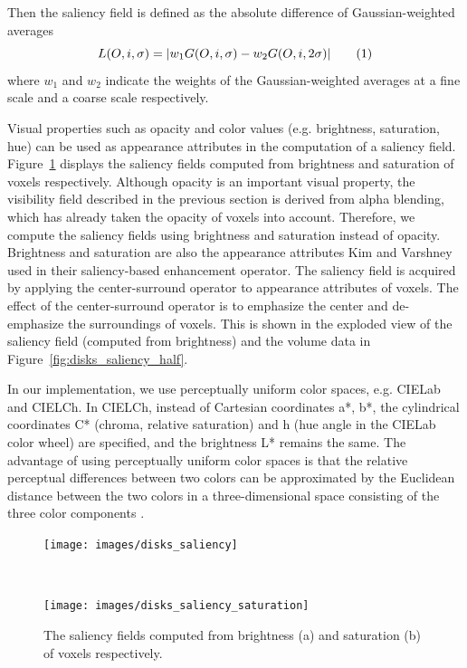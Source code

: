 Then the saliency field is defined as the absolute difference of Gaussian-weighted averages
\[ L(O,i,\sigma)=|w_{1}G(O,i,\sigma)-w_{2}G(O,i,2\sigma)|
\addtag \]
where $ w_{1} $ and $ w_{2} $ indicate the weights of the Gaussian-weighted averages at a fine scale and a coarse scale respectively.

Visual properties such as opacity and color values (e.g. brightness, saturation, hue) can be used as appearance attributes in the computation of a saliency field.
Figure~\ref{fig:disks_saliency} displays the saliency fields computed from brightness and saturation of voxels respectively.
Although opacity is an important visual property, the visibility field described in the previous section is derived from alpha blending, which has already taken the opacity of voxels into account. Therefore, we compute the saliency fields using brightness and saturation instead of opacity. Brightness and saturation are also the appearance attributes Kim and Varshney \cite{kim_saliency-guided_2006} used in their saliency-based enhancement operator.
The saliency field is acquired by applying the center-surround operator to appearance attributes of voxels.
The effect of the center-surround operator is to emphasize the center and de-emphasize the surroundings of voxels. This is shown in the exploded view of the saliency field (computed from brightness) and the volume data in Figure~\ref{fig:disks_saliency_half}.

In our implementation, we use perceptually uniform color spaces, e.g. CIELab and CIELCh.
In CIELCh, instead of Cartesian coordinates a*, b*, the cylindrical coordinates C* (chroma, relative saturation) and h (hue angle in the CIELab color wheel) are specified, and the brightness L* remains the same.
The advantage of using perceptually uniform color spaces is that the relative perceptual differences between two colors can be approximated by the Euclidean distance between the two colors in a three-dimensional space consisting of the three color components \cite{fairchild_color_2013}.

\begin{figure}
	\centering
	\begin{minipage}{.4\textwidth}
		\texttt{[image: images/disks\_saliency]}
		\subcaption{}
	\end{minipage}~
	\begin{minipage}{.4\textwidth}
		\texttt{[image: images/disks\_saliency\_saturation]}
		\subcaption{}
	\end{minipage}
	\caption{The saliency fields computed from brightness (a) and saturation (b) of voxels respectively.}
	\label{fig:disks_saliency}
\end{figure}

